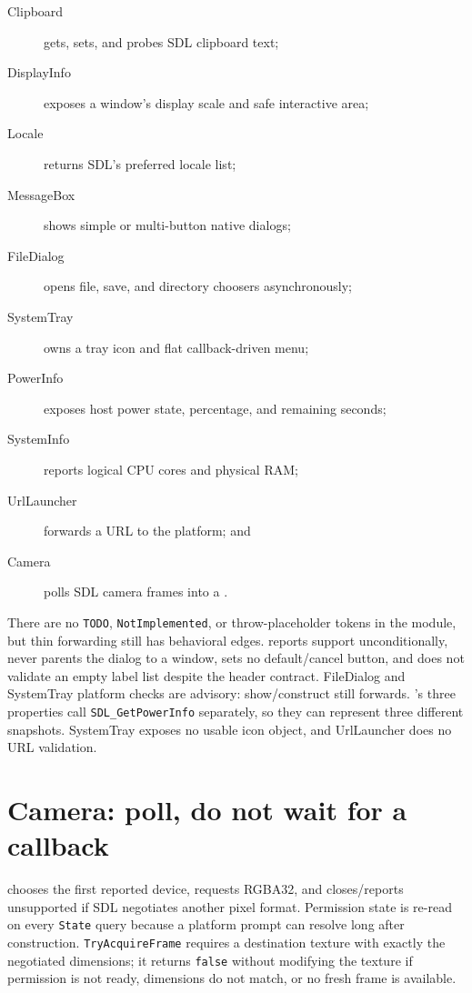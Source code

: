 \begin{description}
  \item[Clipboard] gets, sets, and probes SDL clipboard text;
  \item[DisplayInfo] exposes a window's display scale and safe interactive area;
  \item[Locale] returns SDL's preferred locale list;
  \item[MessageBox] shows simple or multi-button native dialogs;
  \item[FileDialog] opens file, save, and directory choosers asynchronously;
  \item[SystemTray] owns a tray icon and flat callback-driven menu;
  \item[PowerInfo] exposes host power state, percentage, and remaining seconds;
  \item[SystemInfo] reports logical CPU cores and physical RAM;
  \item[UrlLauncher] forwards a URL to the platform; and
  \item[Camera] polls SDL camera frames into a .
\end{description}

There are no \texttt{TODO}, \texttt{NotImplemented}, or throw-placeholder tokens in the
module, but thin forwarding still has behavioral edges.  reports support
unconditionally, never parents the dialog to a window, sets no default/cancel button, and does
not validate an empty label list despite the header contract. FileDialog and SystemTray
platform checks are advisory: show/construct still forwards. 's three
properties call \texttt{SDL\_GetPowerInfo} separately, so they can represent three different
snapshots. SystemTray exposes no usable icon object, and UrlLauncher does no URL validation.

\section{Camera: poll, do not wait for a callback}

 chooses the first reported device, requests RGBA32, and closes/reports
unsupported if SDL negotiates another pixel format. Permission state is re-read on every
\texttt{State} query because a platform prompt can resolve long after construction.
\texttt{TryAcquireFrame} requires a destination texture with exactly the negotiated dimensions;
it returns \texttt{false} without modifying the texture if permission is not ready, dimensions
do not match, or no fresh frame is available.

